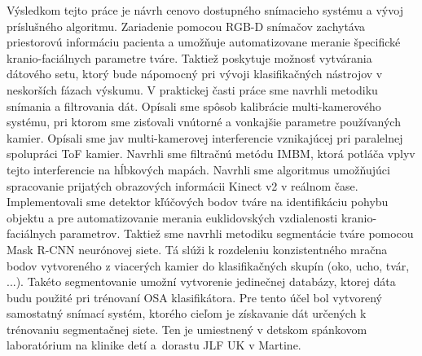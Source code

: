 Výsledkom tejto práce je návrh cenovo dostupného snímacieho systému a vývoj príslušného algoritmu. Zariadenie pomocou RGB-D snímačov zachytáva priestorovú informáciu pacienta a umožňuje automatizovane meranie špecifické kranio-faciálnych parametre tváre. Taktiež poskytuje možnosť vytvárania dátového setu, ktorý bude nápomocný pri vývoji klasifikačných nástrojov v neskorších fázach výskumu. 
\newpage
V praktickej časti práce sme navrhli metodiku snímania a filtrovania dát. Opísali sme spôsob kalibrácie multi-kamerového systému, pri ktorom sme zisťovali vnútorné a vonkajšie parametre používaných kamier. Opísali sme jav multi-kamerovej interferencie vznikajúcej pri paralelnej spolupráci ToF kamier. Navrhli sme filtračnú metódu IMBM, ktorá potláča vplyv tejto interferencie na hĺbkových mapách. Navrhli sme algoritmus umožňujúci spracovanie prijatých obrazových informácii Kinect v2 v reálnom čase. Implementovali sme detektor kľúčových bodov tváre na identifikáciu pohybu objektu a pre automatizovanie merania euklidovských vzdialenosti kranio-faciálnych parametrov. Taktiež sme navrhli metodiku segmentácie tváre pomocou Mask R-CNN neurónovej siete. Tá slúži k rozdeleniu konzistentného mračna bodov vytvoreného z viacerých kamier do klasifikačných skupín (oko, ucho, tvár, ...). Takéto segmentovanie umožní vytvorenie jedinečnej databázy, ktorej dáta budu použité pri trénovaní OSA klasifikátora. Pre tento účel bol vytvorený samostatný snímací systém, ktorého cieľom je získavanie dát určených k trénovaniu segmentačnej siete. Ten je umiestnený v detskom spánkovom laboratórium na klinike detí a dorastu JLF UK v Martine. 


